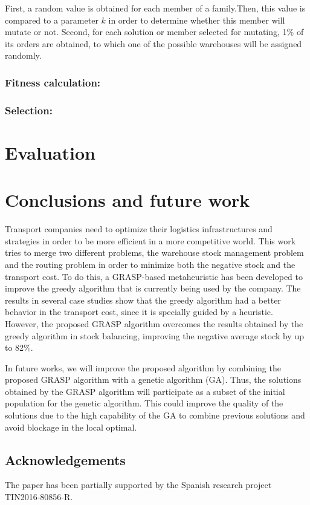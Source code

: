\documentclass[letterpaper]{article} %
\begin{document}
First, a random value is obtained for each member of a family.Then, this value is compared to a parameter $k$ in order to determine whether this member will mutate or not. Second, for each solution or member selected for mutating, 1\% of its orders are obtained, to which one of the possible warehouses will be assigned randomly.

\subsubsection*{Fitness calculation:}


\subsubsection*{Selection:}


\section*{Evaluation}




\section*{Conclusions and future work}


Transport companies need to optimize their logistics infrastructures and strategies in order to be more efficient in a more competitive world. This work tries to merge two different problems, the warehouse stock management problem and the routing problem in order to minimize both the negative stock and the transport cost. To do this, a GRASP-based metaheuristic has been developed to improve the greedy algorithm that is currently being used by the company. The results in several case studies show that the greedy algorithm had a better behavior in the transport cost, since it is specially guided by a heuristic. However, the proposed GRASP algorithm overcomes the results obtained by the greedy algorithm in stock balancing, improving the negative average stock by up to 82\%.

In future works, we will improve the proposed algorithm by combining the proposed GRASP algorithm with a genetic algorithm (GA). Thus, the solutions obtained by the GRASP algorithm will participate as a subset of the initial population for the genetic algorithm. This could improve the quality of the solutions due to the high capability of the GA to combine previous solutions and avoid blockage in the local optimal.


\subsection*{Acknowledgements}
The paper has been partially supported by the Spanish research project TIN2016-80856-R.



\end{document}
